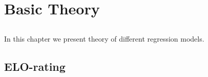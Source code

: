 
\chapter{Basic Theory}

\section{}
In this chapter we present theory of different regression models.
\section{ELO-rating}


